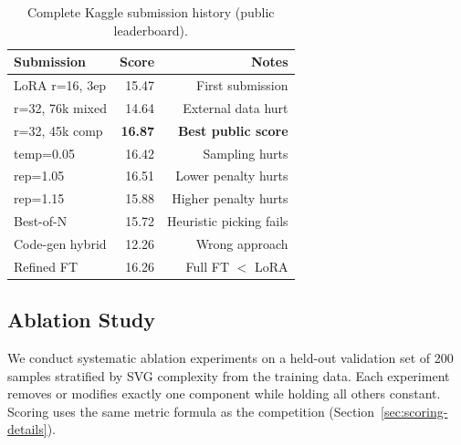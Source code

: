 \documentclass[11pt]{article}
\begin{document}
\begin{table}[h]
\centering
\small
\begin{tabular}{lrr}
\toprule
\textbf{Submission} & \textbf{Score} & \textbf{Notes} \\
\midrule
LoRA r=16, 3ep & 15.47 & First submission \\
r=32, 76k mixed & 14.64 & External data hurt \\
r=32, 45k comp & \textbf{16.87} & \textbf{Best public score} \\
temp=0.05 & 16.42 & Sampling hurts \\
rep=1.05 & 16.51 & Lower penalty hurts \\
rep=1.15 & 15.88 & Higher penalty hurts \\
Best-of-N & 15.72 & Heuristic picking fails \\
Code-gen hybrid & 12.26 & Wrong approach \\
Refined FT & 16.26 & Full FT $<$ LoRA \\
\bottomrule
\end{tabular}
\caption{Complete Kaggle submission history (public leaderboard).}
\label{tab:kaggle-results}
\end{table}

\subsection{Ablation Study}
\label{sec:ablation}

We conduct systematic ablation experiments on a held-out validation set of 200 samples stratified by SVG complexity from the training data. Each experiment removes or modifies exactly one component while holding all others constant. Scoring uses the same metric formula as the competition (Section~\ref{sec:scoring-details}).
\end{document}
